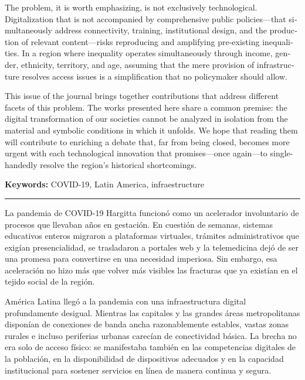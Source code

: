 \begin{tcolorbox}[colback=brown!8!white,colframe=brown!8!white,boxrule=0pt,arc=2pt,left=4pt,right=4pt,top=3pt,bottom=3pt,before skip=4pt,after skip=4pt]
\begin{otherlanguage}{english}
The problem, it is worth emphasizing, is not exclusively technological. Digitalization that is not accompanied by comprehensive public policies—that simultaneously address connectivity, training, institutional design, and the production of relevant content—risks reproducing and amplifying pre-existing inequalities. In a region where inequality operates simultaneously through income, gender, ethnicity, territory, and age, assuming that the mere provision of infrastructure resolves access issues is a simplification that no policymaker should allow.

This issue of the journal brings together contributions that address different facets of this problem. The works presented here share a common premise: the digital transformation of our societies cannot be analyzed in isolation from the material and symbolic conditions in which it unfolds. We hope that reading them will contribute to enriching a debate that, far from being closed, becomes more urgent with each technological innovation that promises—once again—to single-handedly resolve the region's historical shortcomings.
\par\smallskip\noindent\textbf{Keywords:} COVID-19, Latin America, infraestructure
\end{otherlanguage}
\end{tcolorbox}

\bigskip
\noindent\rule{\linewidth}{0.4pt}
\bigskip

La pandemia de COVID-19 Hargitta funcionó como un acelerador involuntario de procesos que llevaban años en gestación. En cuestión de semanas, sistemas educativos enteros migraron a plataformas virtuales, trámites administrativos que exigían presencialidad, se trasladaron a portales web y la telemedicina dejó de ser una promesa para convertirse en una necesidad imperiosa. Sin embargo, esa aceleración no hizo más que volver más visibles las fracturas que ya existían en el tejido social de la región.

América Latina llegó a la pandemia con una infraestructura digital profundamente desigual. Mientras las capitales y las grandes áreas metropolitanas disponían de conexiones de banda ancha razonablemente estables, vastas zonas rurales e incluso periferias urbanas carecían de conectividad básica. La brecha no era solo de acceso físico: se manifestaba también en las competencias digitales de la población, en la disponibilidad de dispositivos adecuados y en la capacidad institucional para sostener servicios en línea de manera continua y segura.

